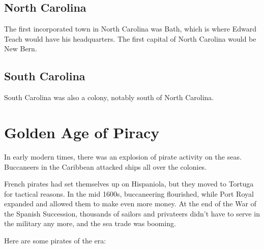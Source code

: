 \subsection*{North Carolina}

The first incorporated town in North Carolina was Bath, which is where Edward Teach would have his headquarters.
The first capital of North Carolina would be New Bern.


\subsection*{South Carolina}

South Carolina was also a colony, notably south of North Carolina.

\section{Golden Age of Piracy}

In early modern times, there was an explosion of pirate activity on the seas.
Buccaneers in the Caribbean attacked ships all over the colonies.

French pirates had set themselves up on Hispaniola,
but they moved to Tortuga for tactical reasons.
In the mid 1600s, buccaneering flourished,
while Port Royal expanded and allowed them to make even more money.
At the end of the War of the Spanish Succession,
thousands of sailors and privateers didn't have to serve in the military any more, and the sea trade was booming.

Here are some pirates of the era:

